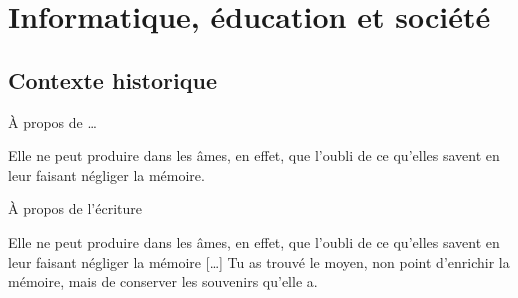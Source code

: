 
\section{Informatique, éducation et société}

\subsection{Contexte historique}
\begin{frame}{À propos de \ldots}
\begin{coolquote}
Elle ne peut produire dans les âmes, en effet, que l’oubli de ce qu’elles savent en leur faisant négliger la mémoire.
\end{coolquote}
\end{frame}
\begin{frame}{À propos de l'écriture}
\begin{coolquote}
Elle ne peut produire dans les âmes, en effet, que l’oubli de ce qu’elles savent en leur faisant négliger la mémoire [\ldots] Tu as trouvé le moyen, non point d’enrichir la mémoire, mais de conserver les souvenirs qu’elle a.
\end{coolquote}
\end{frame}
